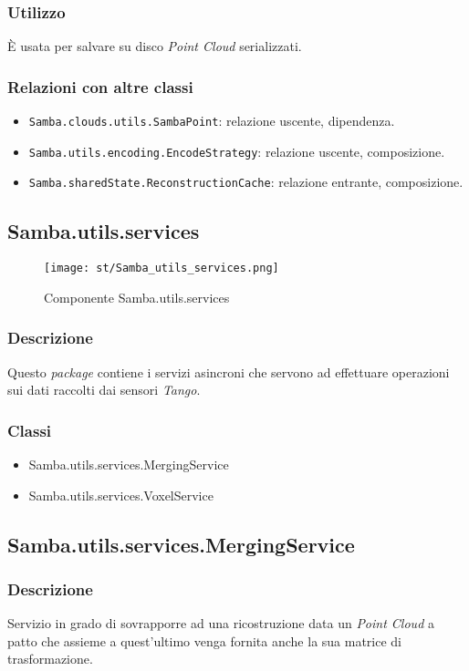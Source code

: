 \subsubsection{Utilizzo}
È usata per salvare su disco \emph{Point Cloud} serializzati.
\subsubsection{Relazioni con altre classi}
\begin{itemize}
	\item \texttt{Samba.clouds.utils.SambaPoint}: relazione uscente, dipendenza.
	\item \texttt{Samba.utils.encoding.EncodeStrategy}: relazione uscente, composizione.
	\item \texttt{Samba.sharedState.ReconstructionCache}: relazione entrante, composizione.
\end{itemize}

\subsection{Samba.utils.services}
\begin{figure}[!h] 
    \centering 
    \texttt{[image: st/Samba\_utils\_services.png]} 
    \caption{Componente Samba.utils.services}
\end{figure}
\subsubsection{Descrizione}
Questo \emph{package} contiene i servizi asincroni che servono ad effettuare operazioni sui dati raccolti dai sensori \emph{Tango}.
\subsubsection{Classi}
\begin{itemize}
	\item Samba.utils.services.MergingService
	\item Samba.utils.services.VoxelService
\end{itemize}

\subsection{Samba.utils.services.MergingService}
\subsubsection{Descrizione}
Servizio in grado di sovrapporre ad una ricostruzione data un \emph{Point Cloud} a patto che assieme a quest'ultimo venga fornita anche la sua matrice di trasformazione.
